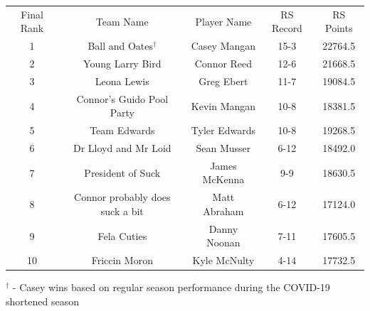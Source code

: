 \documentclass[11pt,letterpaper]{article}
\begin{document}
\vspace{-25pt}
\begin{table} [h]
\begin{center}
\begin{tabular} { c c c c c }
\\ Final Rank & Team Name & Player Name & RS Record & RS Points
\\ 1 & Ball and Oates$^\dag$ & Casey Mangan & 15-3 & 22764.5
\\ 2 & Young Larry Bird & Connor Reed & 12-6 & 21668.5
\\ 3 & Leona Lewis & Greg Ebert & 11-7 & 19084.5
\\ 4 & Connor's Guido Pool Party & Kevin Mangan & 10-8 & 18381.5
\\ 5 & Team Edwards & Tyler Edwards & 10-8 & 19268.5
\\ 6 & Dr Lloyd and Mr Loid & Sean Musser & 6-12 & 18492.0
\\ 7 & President of Suck & James McKenna & 9-9 & 18630.5
\\ 8 & Connor probably does suck a bit & Matt Abraham & 6-12 & 17124.0
\\ 9 & Fela Cuties & Danny Noonan & 7-11 & 17605.5
\\ 10 & Friccin Moron & Kyle McNulty & 4-14 & 17732.5
\end{tabular}
\end{center}
\noindent$^\dag$ - Casey wins based on regular season performance during the COVID-19 shortened season
\end{table}
\end{document}
